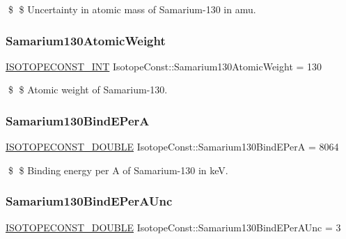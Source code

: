 \$ \$ Uncertainty in atomic mass of Samarium-\/130 in amu. \mbox{\label{group___isotope_const-_samarium-_sm130_ga4292faca181fd8d787ed064357477572}} 
\subsubsection{\texorpdfstring{Samarium130\+Atomic\+Weight}{Samarium130AtomicWeight}}
{\footnotesize\ttfamily \mbox{\hyperlink{group___isotope_const-_macros_ga5f18360b3e99483a35c32d789e62621c}{I\+S\+O\+T\+O\+P\+E\+C\+O\+N\+S\+T\+\_\+\+I\+NT}} Isotope\+Const\+::\+Samarium130\+Atomic\+Weight = 130}

\$ \$ Atomic weight of Samarium-\/130. \mbox{\label{group___isotope_const-_samarium-_sm130_ga149f60a1639d32e26512fa3d25704a5e}} 
\subsubsection{\texorpdfstring{Samarium130\+Bind\+E\+PerA}{Samarium130BindEPerA}}
{\footnotesize\ttfamily \mbox{\hyperlink{group___isotope_const-_macros_ga8f45a7272ce02c0b4c65c44636ed719a}{I\+S\+O\+T\+O\+P\+E\+C\+O\+N\+S\+T\+\_\+\+D\+O\+U\+B\+LE}} Isotope\+Const\+::\+Samarium130\+Bind\+E\+PerA = 8064}

\$ \$ Binding energy per A of Samarium-\/130 in keV. \mbox{\label{group___isotope_const-_samarium-_sm130_ga1654e5d982c672e58684dffc83e68fdd}} 
\subsubsection{\texorpdfstring{Samarium130\+Bind\+E\+Per\+A\+Unc}{Samarium130BindEPerAUnc}}
{\footnotesize\ttfamily \mbox{\hyperlink{group___isotope_const-_macros_ga8f45a7272ce02c0b4c65c44636ed719a}{I\+S\+O\+T\+O\+P\+E\+C\+O\+N\+S\+T\+\_\+\+D\+O\+U\+B\+LE}} Isotope\+Const\+::\+Samarium130\+Bind\+E\+Per\+A\+Unc = 3}

